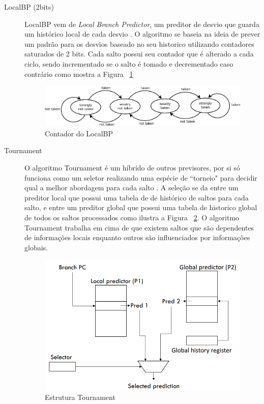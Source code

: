 \documentclass[12pt]{article}
\begin{document}
\begin{description}
\item[LocalBP (2bits)]

LocalBP vem de \textit{Local Branch Predictor}, um preditor de desvio que guarda um histórico local de cada desvio \cite{Patterson:1990:CAQ:77493}. O algoritmo se baseia na ideia de prever um padrão para os desvios baseado no seu historico utilizando contadores saturados de 2 bits. Cada salto possui seu contador que é alterado a cada ciclo, sendo incrementado se o salto é tomado e decrementado caso contrário como mostra a Figura ~\ref{fig:localbp}

\begin{figure}[H]
\centering
\includegraphics[width=.7\textwidth]{Imagens/contador.png}
\caption{Contador do LocalBP}
\label{fig:localbp}
\end{figure}


\item[Tournament]

O algoritmo Tournament é um híbrido de outros previsores, por si só funciona como um seletor realizando uma espécie de ``torneio" para decidir qual a melhor abordagem para cada salto \cite{Patterson:1990:CAQ:77493}. A seleção se da entre um preditor local que possui uma tabela de de histórico de saltos para cada salto, e entre um preditor global que possui uma tabela de historico global de todos os saltos processados como ilustra a Figura ~\ref{fig:tournament}. O algoritmo Tournament trabalha em cima de que existem saltos que são dependentes de informações locais enquanto outros são influenciados por informações globais.

\begin{figure}[H]
\centering
\includegraphics[width=.4\textwidth]{Imagens/tournament.PNG}
\caption{Estrutura Tournament}
\label{fig:tournament}
\end{figure}

\end{description}
\end{document}
